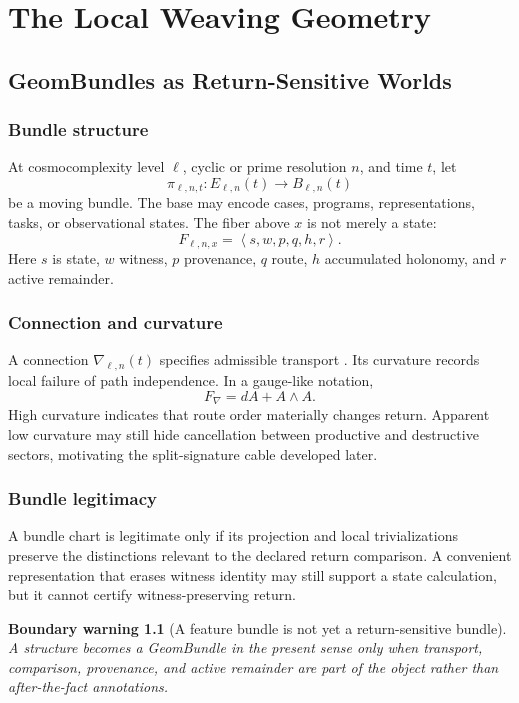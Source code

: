 \documentclass[12pt,openany]{book}
\newtheorem{warning}[definition]{Boundary warning}
\theoremstyle{remark}
\newcommand{\typedtuple}[1]{\left\langle #1 \right\rangle}
\begin{document}
\part{The Local Weaving Geometry}

\chapter{GeomBundles as Return-Sensitive Worlds}
\label{ch:geombundles}

\section{Bundle structure}
At cosmocomplexity level $\ell$, cyclic or prime resolution $n$, and time $t$, let
\[
\pi_{\ell,n,t}:E_{\ell,n}(t)\longrightarrow B_{\ell,n}(t)
\]
be a moving bundle. The base may encode cases, programs, representations, tasks, or observational states. The fiber above $x$ is not merely a state:
\[
F_{\ell,n,x}
=
\typedtuple{s,w,p,q,h,r}.
\]
Here $s$ is state, $w$ witness, $p$ provenance, $q$ route, $h$ accumulated holonomy, and $r$ active remainder.

\section{Connection and curvature}
A connection $\nabla_{\ell,n}(t)$ specifies admissible transport \cite{KobayashiNomizu}. Its curvature records local failure of path independence. In a gauge-like notation,
\[
F_{\nabla}=dA+A\wedge A.
\]
High curvature indicates that route order materially changes return. Apparent low curvature may still hide cancellation between productive and destructive sectors, motivating the split-signature cable developed later.

\section{Bundle legitimacy}
A bundle chart is legitimate only if its projection and local trivializations preserve the distinctions relevant to the declared return comparison. A convenient representation that erases witness identity may still support a state calculation, but it cannot certify witness-preserving return.

\begin{warning}[A feature bundle is not yet a return-sensitive bundle]
A structure becomes a GeomBundle in the present sense only when transport, comparison, provenance, and active remainder are part of the object rather than after-the-fact annotations.
\end{warning}
\end{document}
